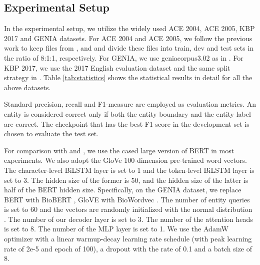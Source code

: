 \documentclass{article}
\begin{document}
\subsection{Experimental Setup}
In the experimental setup, we utilize the widely used ACE 2004, ACE 2005, KBP 2017 and GENIA datasets. For ACE 2004 and ACE 2005, we follow the previous work \cite{katiyar2018nested,lin2019sequence} to keep files from ,  and  and divide these files into train, dev and test sets in the ratio of 8:1:1, respectively. For GENIA, we use geniacorpus3.02 as in \citep{katiyar2018nested}. For KBP 2017, we use the 2017 English evaluation dataset and the same split strategy in \citep{lin2019sequence}. Table \ref{tab:statistics} shows the statistical results in detail for all the above datasets.

Standard precision, recall and F1-measure are employed as evaluation metrics. An entity is considered correct only if both the entity boundary and the entity label are correct. The checkpoint that has the best F1 score in the development set is chosen to evaluate the test set.

For comparison with \citep{jue2020pyramid} and \citep{yu2020named}, we use the cased large version of BERT in most experiments. We also adopt the GloVe \cite{pennington-etal-2014-glove} 100-dimension pre-trained word vectors. The character-level BiLSTM layer is set to 1 and the token-level BiLSTM layer is set to 3. The hidden size of the former is 50, and the hidden size of the latter is half of the BERT hidden size. Specifically, on the GENIA dataset, we replace BERT with BioBERT \cite{10.1093/bioinformatics/btz682}, GloVE with BioWordvec \cite{chiu-etal-2016-train}. The number of entity queries  is set to 60 and the vectors are randomly initialized with the normal distribution . The number of our decoder layer  is set to 3. The number of the attention heads is set to 8. The number of the MLP layer is set to 1. We use the AdamW \cite{DBLP:journals/corr/abs-1711-05101} optimizer with a linear warmup-decay learning rate schedule (with peak learning rate of 2e-5 and epoch of 100), a dropout with the rate of 0.1 and a batch size of 8.
\end{document}
